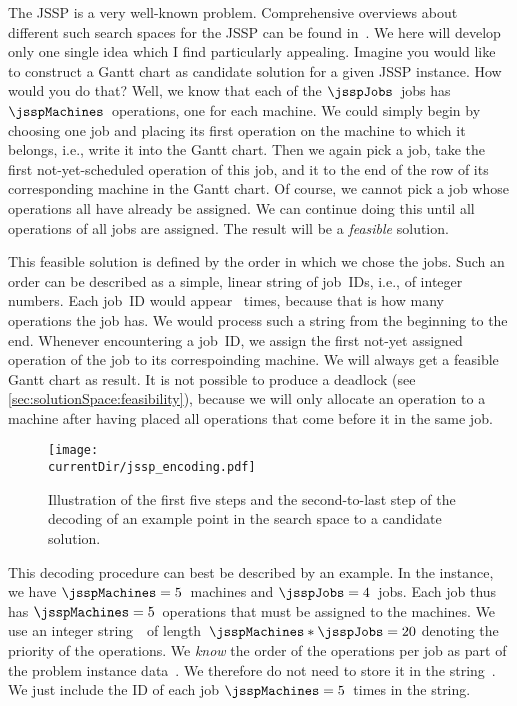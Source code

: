 The \gls{JSSP} is a very well-known problem.
Comprehensive overviews about different such search spaces for the \gls{JSSP} can be found in~\cite{CGT1996ATSOJSSPUGAIR,W2013GAFSSPAS,A2010RIGAFTJSPACS,YN1997GAFJSSP}.
We here will develop only one single idea which I find particularly appealing.%
%
%
%
Imagine you would like to construct a Gantt chart as candidate solution for a given \gls{JSSP} instance.
How would you do that?
Well, we know that each of the $\jsspJobs$~jobs has $\jsspMachines$~operations, one for each machine.
We could simply begin by choosing one job and placing its first operation on the machine to which it belongs, i.e., write it into the Gantt chart.
Then we again pick a job, take the first not-yet-scheduled operation of this job, and  it to the end of the row of its corresponding machine in the Gantt chart.
Of course, we cannot pick a job whose operations all have already be assigned.
We can continue doing this until all operations of all jobs are assigned.
The result will be a \emph{feasible} solution.

This feasible solution is defined by the order in which we chose the jobs.
Such an order can be described as a simple, linear string of job~IDs, i.e., of integer numbers.
Each job~ID would appear \jsspMachines~times, because that is how many operations the job has.
We would process such a string from the beginning to the end.
Whenever encountering a job~ID, we assign the first not-yet assigned operation of the job to its correspoinding machine.
We will always get a feasible Gantt chart as result.
It is not possible to produce a deadlock (see \cref{sec:solutionSpace:feasibility}), because we will only allocate an operation to a machine after having placed all operations that come before it in the same job.

\begin{figure}%
\centering%
\texttt{[image: \\currentDir/jssp\_encoding.pdf]}%
\caption{Illustration of the first five steps and the second-to-last step of the decoding of an example point in the search space to a candidate solution.}%
\label{fig:jssp_encoding}%
\end{figure}

This decoding procedure can best be described by an example.
In the  instance, we have $\jsspMachines=5$~machines and $\jsspJobs=4$~jobs.
Each job thus has $\jsspMachines=5$~operations that must be assigned to the machines.
We use an integer string~\sespel\ of length~$\jsspMachines*\jsspJobs=20$ denoting the priority of the operations.
We \emph{know} the order of the operations per job as part of the problem instance data~\instance.
We therefore do not need to store it in the string~\sespel.
We just include the ID of each job $\jsspMachines=5$~times in the string.

